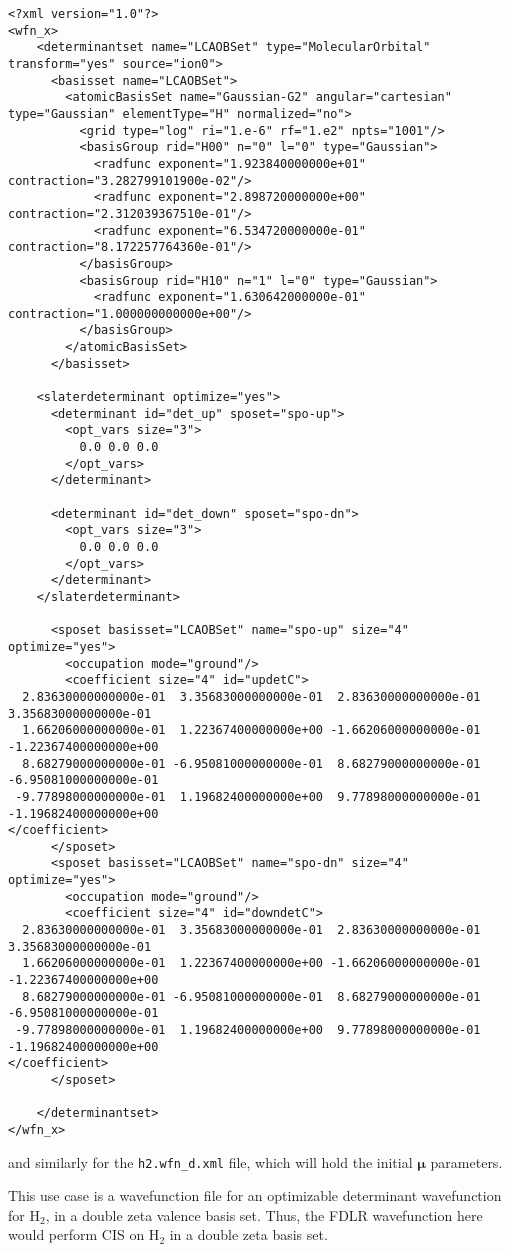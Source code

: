 \begin{lstlisting}[style=QMCPXML]
<?xml version="1.0"?>
<wfn_x>
    <determinantset name="LCAOBSet" type="MolecularOrbital" transform="yes" source="ion0">
      <basisset name="LCAOBSet">
        <atomicBasisSet name="Gaussian-G2" angular="cartesian" type="Gaussian" elementType="H" normalized="no">
          <grid type="log" ri="1.e-6" rf="1.e2" npts="1001"/>
          <basisGroup rid="H00" n="0" l="0" type="Gaussian">
            <radfunc exponent="1.923840000000e+01" contraction="3.282799101900e-02"/>
            <radfunc exponent="2.898720000000e+00" contraction="2.312039367510e-01"/>
            <radfunc exponent="6.534720000000e-01" contraction="8.172257764360e-01"/>
          </basisGroup>
          <basisGroup rid="H10" n="1" l="0" type="Gaussian">
            <radfunc exponent="1.630642000000e-01" contraction="1.000000000000e+00"/>
          </basisGroup>
        </atomicBasisSet>
      </basisset>

    <slaterdeterminant optimize="yes">
      <determinant id="det_up" sposet="spo-up">
        <opt_vars size="3">
          0.0 0.0 0.0
        </opt_vars>
      </determinant>

      <determinant id="det_down" sposet="spo-dn">
        <opt_vars size="3">
          0.0 0.0 0.0
        </opt_vars>
      </determinant>
    </slaterdeterminant>

      <sposet basisset="LCAOBSet" name="spo-up" size="4" optimize="yes">
        <occupation mode="ground"/>
        <coefficient size="4" id="updetC">
  2.83630000000000e-01  3.35683000000000e-01  2.83630000000000e-01  3.35683000000000e-01
  1.66206000000000e-01  1.22367400000000e+00 -1.66206000000000e-01 -1.22367400000000e+00
  8.68279000000000e-01 -6.95081000000000e-01  8.68279000000000e-01 -6.95081000000000e-01
 -9.77898000000000e-01  1.19682400000000e+00  9.77898000000000e-01 -1.19682400000000e+00
</coefficient>
      </sposet>
      <sposet basisset="LCAOBSet" name="spo-dn" size="4" optimize="yes">
        <occupation mode="ground"/>
        <coefficient size="4" id="downdetC">
  2.83630000000000e-01  3.35683000000000e-01  2.83630000000000e-01  3.35683000000000e-01
  1.66206000000000e-01  1.22367400000000e+00 -1.66206000000000e-01 -1.22367400000000e+00
  8.68279000000000e-01 -6.95081000000000e-01  8.68279000000000e-01 -6.95081000000000e-01
 -9.77898000000000e-01  1.19682400000000e+00  9.77898000000000e-01 -1.19682400000000e+00
</coefficient>
      </sposet>

    </determinantset>
</wfn_x>
\end{lstlisting}
and similarly for the \texttt{h2.wfn\_d.xml} file, which will hold the initial $\mathbf{\mu}$ parameters.

This use case is a wavefunction file for an optimizable determinant wavefunction for H$_2$, in a double zeta valence basis set. Thus, the FDLR wavefunction here would perform CIS on H$_2$ in a double zeta basis set.

